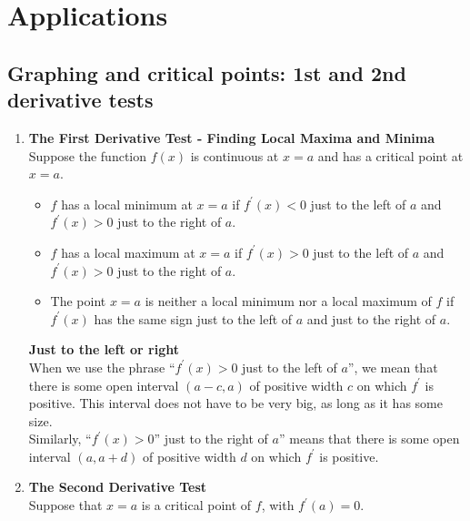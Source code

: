 \chapter{Applications}
\section{Graphing and critical points: 1st and 2nd derivative tests}
\begin{enumerate}
    \item \textbf{The First Derivative Test - Finding Local Maxima and Minima}\\
        \indent Suppose the function \(f(x)\) is continuous at \(x=a\) and has a critical point at \(x=a\). \\
        \begin{itemize}
            \item \(f\) has a local minimum at \(x=a\) if \(f^\prime (x)<0\) just to the left of \(a\) and \(f^\prime (x)>0\) just to the right of \(a\).
            \item \(f\) has a local maximum at \(x=a\) if \(f^\prime (x)>0\) just to the left of \(a\) and \(f^\prime (x)>0\) just to the right of \(a\).
            \item The point \(x=a\) is neither a local minimum nor a local maximum of \(f\) if \(f^\prime (x)\) has the same sign just to the left of \(a\) and just to the right of \(a\).
        \end{itemize}
        \begin{note}
            \textbf{Just to the left or right}\\
            When we use the phrase ``\(f^\prime (x)>0\) just to the left of \(a\)'', we mean that there is some open interval \((a-c,a)\) of positive width \(c\) on which \(f^\prime\) is positive. This interval does not have to be very big, as long as it has some size.\\
            Similarly, ``\(f^\prime (x)>0\)'' just to the right of \(a\)'' means that there is some open interval \((a,a+d)\) of positive width \(d\) on which \(f^\prime\) is positive.
        \end{note}
    \item \textbf{The Second Derivative Test}\\
        \indent Suppose that \(x=a\) is a critical point of \(f\), with \(f^\prime (a)=0\).
\end{enumerate}
